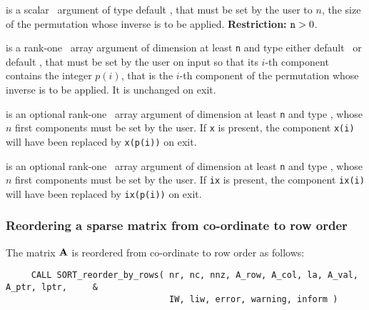 \documentclass{galahad}
\begin{document}
\begin{description}
 is a scalar \intentin\ argument of type default
\integer, that must be set by the user to $n$, the size of the permutation
whose inverse is to be applied.
{\bf Restriction:} ${\tt n} > 0$.

 is a rank-one \intentinout\ array argument of
dimension at least {\tt n} and type either default
\integer\ or default \realdp, that must be set by the user
on input so that its $i$-th component contains the integer $p(i)$, that is the
$i$-th component of the permutation whose inverse is to be applied.
It is unchanged on exit.

 is an optional rank-one \intentinout\ array argument of
dimension at least {\tt n} and type \realdp, whose $n$ first components must
be set by the user. If {\tt x} is present, the component {\tt x(i)} will have
been replaced by {\tt x(p(i))} on exit.

 is an optional rank-one \intentinout\ array argument of
dimension at least {\tt n} and type \integer, whose $n$ first components must
be set by the user. If {\tt ix} is present, the component {\tt ix(i)} will have
been replaced by {\tt ix(p(i))} on exit.
\end{description}

\subsubsection{Reordering a sparse matrix from co-ordinate to row order}

The matrix ${\mathbf{A}}$ is reordered from co-ordinate to row order as follows:
\hskip0.5in
\def\baselinestretch{1.0} {\tt \begin{verbatim}
     CALL SORT_reorder_by_rows( nr, nc, nnz, A_row, A_col, la, A_val,  A_ptr, lptr,     &
                                IW, liw, error, warning, inform )
\end{verbatim}}
\def\baselinestretch{1.0}
\end{document}
